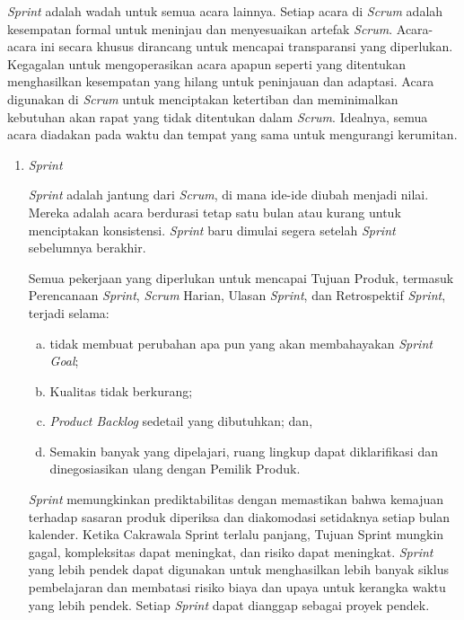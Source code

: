	\emph{Sprint} adalah wadah untuk semua acara lainnya. Setiap acara di \emph{Scrum} adalah kesempatan formal untuk meninjau dan menyesuaikan artefak \emph{Scrum}. Acara-acara ini secara khusus dirancang untuk mencapai transparansi yang diperlukan. Kegagalan untuk mengoperasikan acara apapun seperti yang ditentukan menghasilkan kesempatan yang hilang untuk peninjauan dan adaptasi. Acara digunakan di \emph{Scrum} untuk menciptakan ketertiban dan meminimalkan kebutuhan akan rapat yang tidak ditentukan dalam \emph{Scrum}. Idealnya, semua acara diadakan pada waktu dan tempat yang sama untuk mengurangi kerumitan.
	
	\begin{enumerate}
	
		\item \emph{Sprint}
		
		\emph{Sprint} adalah jantung dari \emph{Scrum}, di mana ide-ide diubah menjadi nilai. Mereka adalah acara berdurasi tetap satu bulan atau kurang untuk menciptakan konsistensi. \emph{Sprint} baru dimulai segera setelah \emph{Sprint} sebelumnya berakhir.

		Semua pekerjaan yang diperlukan untuk mencapai Tujuan Produk, termasuk Perencanaan \emph{Sprint}, \emph{Scrum} Harian, Ulasan \emph{Sprint}, dan Retrospektif \emph{Sprint}, terjadi selama:
		
		\begin{enumerate}[a.]
		
			\item tidak membuat perubahan apa pun yang akan membahayakan \emph{Sprint Goal};

			\item Kualitas tidak berkurang;

			\item \emph{Product Backlog} sedetail yang dibutuhkan; dan,

			\item Semakin banyak yang dipelajari, ruang lingkup dapat diklarifikasi dan dinegosiasikan ulang dengan Pemilik Produk.
		
		\end{enumerate}
		
		\emph{Sprint} memungkinkan prediktabilitas dengan memastikan bahwa kemajuan terhadap sasaran produk diperiksa dan diakomodasi setidaknya setiap bulan kalender. Ketika Cakrawala Sprint terlalu panjang, Tujuan Sprint mungkin gagal, kompleksitas dapat meningkat, dan risiko dapat meningkat. \emph{Sprint} yang lebih pendek dapat digunakan untuk menghasilkan lebih banyak siklus pembelajaran dan membatasi risiko biaya dan upaya untuk kerangka waktu yang lebih pendek. Setiap \emph{Sprint} dapat dianggap sebagai proyek pendek.


\end{enumerate}
